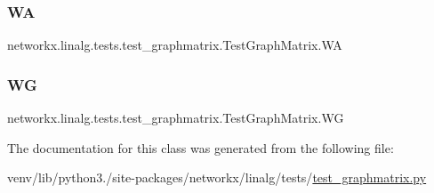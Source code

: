 \subsubsection{\texorpdfstring{WA}{WA}}
{\footnotesize\ttfamily networkx.\+linalg.\+tests.\+test\+\_\+graphmatrix.\+Test\+Graph\+Matrix.\+WA}

\mbox{\label{classnetworkx_1_1linalg_1_1tests_1_1test__graphmatrix_1_1TestGraphMatrix_aa39750530a4e4015bcfd288e151db85f}} 
\subsubsection{\texorpdfstring{WG}{WG}}
{\footnotesize\ttfamily networkx.\+linalg.\+tests.\+test\+\_\+graphmatrix.\+Test\+Graph\+Matrix.\+WG}



The documentation for this class was generated from the following file\+:\begin{DoxyCompactItemize}
\item 
venv/lib/python3./site-\/packages/networkx/linalg/tests/\hyperlink{test__graphmatrix_8py}{test\+\_\+graphmatrix.\+py}\end{DoxyCompactItemize}
